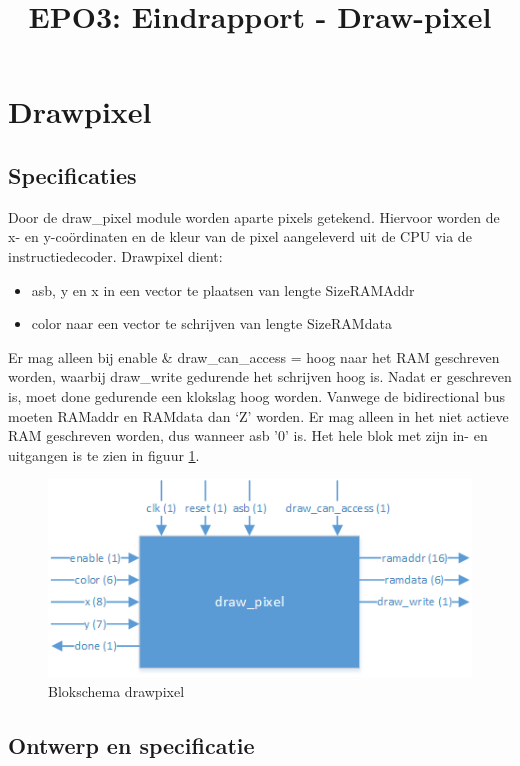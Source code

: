 \documentclass{scrartcl} %
\author{}%
\title{EPO3: Eindrapport - Draw-pixel}
\begin{document}
\section{Drawpixel} %
\label{sec:drawpixel} %

\subsection{Specificaties}
\label{ssec:specs_dp}
Door de draw\_pixel module worden aparte pixels getekend. Hiervoor worden de x- en y-coördinaten en de kleur van de pixel aangeleverd uit de CPU via de instructiedecoder.  Drawpixel dient: 
\begin{itemize}
\item asb, y en x in een vector te plaatsen van lengte SizeRAMAddr
\item color naar een vector te schrijven van lengte SizeRAMdata
\end{itemize}
  Er mag alleen bij enable \& draw\_can\_access = hoog naar het RAM geschreven worden, waarbij draw\_write gedurende het schrijven hoog is.  Nadat er geschreven is, moet done gedurende een klokslag hoog worden. Vanwege de bidirectional bus moeten RAMaddr en RAMdata dan `Z' worden. Er mag alleen in het niet actieve RAM geschreven worden, dus wanneer asb '0' is. Het hele blok met zijn in- en uitgangen is te zien in figuur  \ref{fig:dp_blokschema}. 
\begin{figure} [h!]
\centering
\includegraphics [width = \textwidth] {resource/dp_blokschema-rc}
\caption{Blokschema drawpixel}
\label{fig:dp_blokschema}
\end{figure}

\subsection{Ontwerp en specificatie}
\label{ssec:vhdl_dp}
\end{document}
